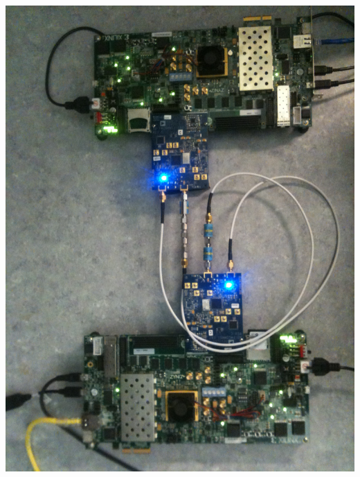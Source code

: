 \begin{center}
\includegraphics[width=\textwidth]{content/fig/hardware_setup.JPG}
\label{hardware_setup}
\end{center}


